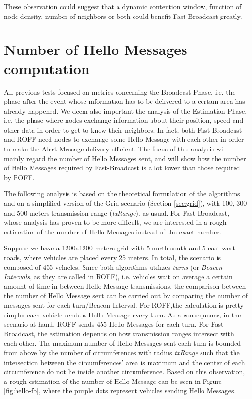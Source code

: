 		
		These observation could suggest that a dynamic contention window, function of node density, number of neighbors or both could benefit Fast-Broadcast greatly.
		
	\section{Number of Hello Messages computation}
		All previous tests focused on metrics concerning the Broadcast Phase, i.e. the phase after the event whose information has to be delivered to a certain area has already happened. We deem also important the analysis of the Estimation Phase, i.e. the phase where nodes exchange information about their position, speed and other data in order to get to know their neighbors. In fact, both Fast-Broadcast and ROFF need nodes to exchange some Hello Message with each other in order to make the Alert Message delivery efficient. The focus of this analysis will mainly regard the number of Hello Messages sent, and will show how the number of Hello Messages required by Fast-Broadcast is a lot lower than those required by ROFF. 
		
		The following analysis is based on the theoretical formulation of the algorithms and on a simplified version of the Grid scenario (Section \ref{sec:grid}), with 100, 300 and 500 meters transmission range (\textit{txRange}), as usual.  For Fast-Broadcast, whose analysis has proven to be more diffcult, we are interested in a rough estimation of the number of Hello Messages instead of the exact number. 
		
		Suppose we have a 1200x1200 meters grid with 5 north-south and 5 east-west roads, where vehicles are placed every 25 meters. In total, the scenario is composed of 455 vehicles. Since both algorithms utilizes \textit{turns} (or \textit{Beacon Intervals}, as they are called in ROFF), i.e. vehicles wait on average a certain amount of time in between Hello Message transmissions, the comparison between the number of Hello Message sent can be carried out by comparing the number of messages sent for each turn/Beacon Interval. For ROFF,the calculation is pretty simple: each vehicle sends a Hello Message every turn. As a consequence, in the scenario at hand, ROFF sends 455 Hello Messages for each turn. For Fast-Broadcast, the estimation depends on how transmission ranges intersect with each other. The maximum number of Hello Messages sent each turn is bounded from above by the number of circumferences with radius \textit{txRange} such that the intersection between the circumferences' area is maximum and the center of each circumference do not lie inside another circumference. Based on this observation, a rough estimation of the number of Hello Message can be seen in Figure \ref{fig:hello-fb}, where the purple dots represent vehicles sending Hello Messages.
		
